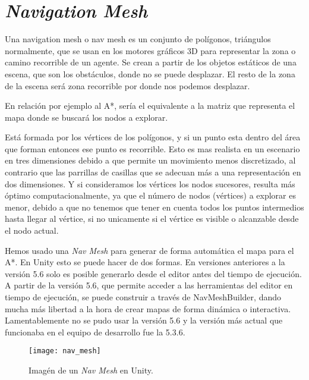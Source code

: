 
\section{\textit{Navigation Mesh}} \label{referenciaNavMesh}
Una navigation mesh o nav mesh es un conjunto de polígonos, triángulos normalmente, que se usan en los motores gráficos 3D para representar la zona o camino recorrible de un agente. Se crean a partir de los objetos estáticos de una escena, que son los obstáculos, donde no se puede desplazar. El resto de la zona de la escena será zona recorrible por donde nos podemos desplazar.

En relación por ejemplo al A*, sería el equivalente a la matriz que representa el mapa donde se buscará los nodos a explorar.

Está formada por los vértices de los polígonos, y si un punto esta dentro del área que forman entonces ese punto es recorrible. Esto es mas realista en un escenario en tres dimensiones debido a que permite un movimiento menos discretizado, al contrario que las parrillas de casillas que se adecuan más a una representación en dos dimensiones. Y si consideramos los vértices los nodos sucesores, resulta más óptimo computacionalmente, ya que el número de nodos (vértices) a explorar es menor, debido a que no tenemos que tener en cuenta todos los puntos intermedios hasta llegar al vértice, si no unicamente si el vértice es visible o alcanzable desde el nodo actual.

Hemos usado una \textit{Nav Mesh} para generar de forma automática el mapa para el A*. En Unity esto se puede hacer de dos formas. En versiones anteriores a la versión 5.6 solo es posible generarlo desde el editor antes del tiempo de ejecución. A partir de la versión 5.6, que permite acceder a las herramientas del editor en tiempo de ejecución, se puede construir a través de NavMeshBuilder, dando mucha más libertad a la hora de crear mapas de forma dinámica o interactiva. Lamentablemente no se pudo usar la versión 5.6 y la versión más actual que funcionaba en el equipo de desarrollo fue la 5.3.6.

\begin{figure}[htpb]
    \centering
    \texttt{[image: nav\_mesh]}
    \caption[Imagén de un \textit{Nav Mesh} en Unity]{Imagén de un \textit{Nav Mesh} en Unity.}
    \label{fig:basics AFM sketch}
\end{figure}


